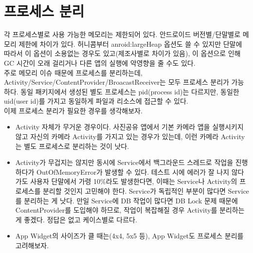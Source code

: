 \begin{comment}
startService 하는 경우가 있는데, 어차피 시작 Activity의 onResume 이후에 실행된다. 따라서 Application에 꼭 넣을 것인지, 시작 Activity에 할 것인지 따져봐야 한다. 왜냐하면 Application.onCreate는 앱이 죽어 있을 때도 BroadcastReceiver, Service, ContentProvider를 다른 앱에서 사용하고자 할 때도 실행하기 때문이다.

restore/full backup일때는 우리가 만든 Application.onCreate를 타지 않는다.

ActivityThread.main
	ActivityThread.attach
	ActivityManagerService.attachApplication
		ActivityManagerService.attacheApplicationLocked
			IApplicationThread.bindApplication
			
\end{comment}

\section{프로세스 분리}
각 프로세스별로 사용 가능한 메모리는 제한되어 있다. 안드로이드 버전별/단말별로 메모리 제한에 차이가 있다.
허니콤부터 anroid:largeHeap 옵션도 쓸 수 있지만 단말에 따라서 이 옵션이 소용없는 경우도 있고(제조사별로 차이가 있음), 이 옵션으로 인해 GC 시간이 오래 걸리거나 다른 앱의 실행에 악영향을 줄 수도 있다.\\ 

주로 메모리 이슈 때문에 프로세스를 분리하는데, Activity/Service/ContentProvider/BroacastReceiver는 모두 프로세스 분리가 가능하다.
동일 패키지에서 생성된 별도 프로세스는 pid(process id)는 다르지만, 동일한 uid(user id)를 가지고 동일하게 파일과 리소스에 접근할 수 있다.\\

이제 프로세스 분리가 필요한 경우를 생각해보자.
\begin{itemize}
\item Activity 자체가 무거운 경우이다. 사진공유 앱에서 기본 카메라 앱을 실행시키지 않고 자신의 카메라 Activity를 가지고 있는 경우가 있는데, 이런 카메라 Activity는 별도 프로세스로 분리하는 것이 낫다.
\item Activity가 무겁지는 않지만 동시에 Service에서 백그라운드 스레드로 작업을 진행하다가 OutOfMemoryError가 발생할 수 있다. 테스트 시에 에러가 잘 나지 않다가도 사용자 단말에서 가령 10\%라도 발생한다면, 이때는 Service나 Activity의 프로세스를 분리할 것인지 고민해야 한다.
Service가 독립적인 부분이 많다면 Service를 분리하는 게 낫다. 만일 Service에 DB 작업이 많다면 DB Lock 문제 때문에 ContentProvider를 도입해야 하므로, 작업이 복잡해질 경우 Activity를 분리하는 게 좋겠다. 정답은 없고 케이스별로 다르다.
\item App Widget의 사이즈가 클 때는(4x4, 5x5 등), App Widget도 프로세스 분리를 고려해보자.
\end{itemize}


